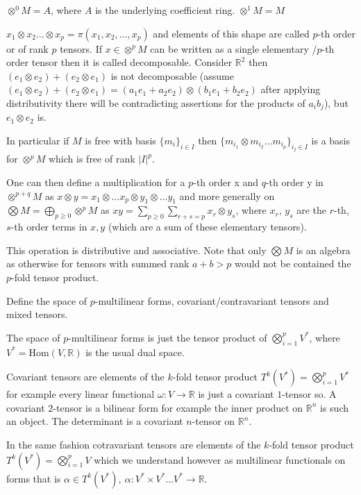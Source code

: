 \(\otimes^{0} M = A\), where \(A\) is the underlying coefficient ring.
\(\otimes^{1} M = M\)

\(x_1 \otimes x_2 \dots \otimes x_p = \pi(x_1, x_2, \dots, x_p) \) and elements of this shape
are called \(p\)-th order or of rank \( p \) tensors. If \(x \in \otimes^{p} M\) can be written as a single elementary
/\(p\)-th order tensor then it is called decomposable. Consider \(\mathbb{R}^{2}\) then \((e_1 \otimes e_2) + (e_2 \otimes e_1)\)
is not decomposable (assume \((e_1 \otimes e_2) + (e_2 \otimes e_1) = (a_1 e_1 + a_2 e_2) \otimes (b_1 e_1 + b_2 e_2)\) after applying
distributivity there will be contradicting assertions for the products of \(a_ib_j\)), but \(e_1 \otimes e_2\) is.

In particular if \(M\) is free with basis \(\{m_i\}_{i \in I}\) then \(\{m_{i_1} \otimes m_{i_2} \dots m_{i_p}\}_{i_j \in I}\)
is a basis for \(\otimes^{p} M\) which is free of rank \(|I|^p\).

One can then define a multiplication for a \(p\)-th order x and \(q\)-th order y in \(\otimes^{p + q} M\) as 
\(x \otimes y = x_1 \otimes \dots x_p \otimes y_1 \otimes \dots y_1\) and more generally on 
\(\bigotimes M = \bigoplus_{p \geq 0} \otimes^{p} M\) as \(x y = \sum_{p \geq 0} \sum_{r + s = p} x_r \otimes y_s\), 
where \(x_r\), \(y_s\) are the \(r\)-th, \(s\)-th order terms in \(x, y\) (which are a sum of these elementary tensors).

This operation is distributive and associative.
Note that only \( \bigotimes M \) is an algebra as otherwise for tensors with summed rank \( a + b > p \)
would not be contained the \( p \)-fold tensor product.


Define the space of \( p \)-multilinear forms, covariant/contravariant
tensors and mixed tensors.

The space of \( p \)-multilinear forms is just the tensor product of \(\bigotimes_{i = 1}^{p} V^\ast\),
where \( V^\ast = \text{Hom}(V, \mathbb{R}) \) is the usual dual space.

Covariant tensors are elements of the \( k \)-fold tensor product \( T^k(V^\ast) = \bigotimes_{i = 1}^{p} V^\ast\)
for example every linear functional \( \omega : V \to \mathbb{R} \) is just a covariant \( 1 \)-tensor so.
A covariant \( 2 \)-tensor is a bilinear form for example the inner product on \( \mathbb{R}^n \) is such an object.
The determinant is a covariant \( n \)-tensor on \( \mathbb{R}^n \).

In the same fashion cotravariant tensors are elements of the \( k \)-fold tensor product \( T^k(V^\ast) = \bigotimes_{i = 1}^{p} V\)
which we understand however as multilinear functionals on forms that is 
\( \alpha \in T^k(V^\ast),\ \alpha : V^\ast \times V^\ast \dots V^\ast \to \mathbb{R}\).

